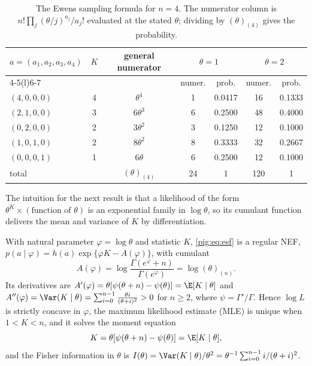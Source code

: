 \begin{table}[t]
\centering
\caption{The Ewens sampling formula for $n=4$. The numerator column is $n!\prod_j(\theta/j)^{a_j}/a_j!$ evaluated at the stated $\theta$; dividing by $(\theta)_{(4)}$ gives the probability.}
\label{pig:tab:n4}
\small
\begin{tabular}{@{}lcccccc@{}}
\toprule
$a=(a_1,a_2,a_3,a_4)$ & $K$ & general numerator & \multicolumn{2}{c}{$\theta=1$} & \multicolumn{2}{c}{$\theta=2$}\\
\cmidrule(lr){4-5}\cmidrule(l){6-7}
 & & & numer. & prob. & numer. & prob.\\
\midrule
$(4,0,0,0)$ & 4 & $\theta^4$ & 1 & 0.0417 & 16 & 0.1333\\
$(2,1,0,0)$ & 3 & $6\theta^3$ & 6 & 0.2500 & 48 & 0.4000\\
$(0,2,0,0)$ & 2 & $3\theta^2$ & 3 & 0.1250 & 12 & 0.1000\\
$(1,0,1,0)$ & 2 & $8\theta^2$ & 8 & 0.3333 & 32 & 0.2667\\
$(0,0,0,1)$ & 1 & $6\theta$ & 6 & 0.2500 & 12 & 0.1000\\
\midrule
total & & $(\theta)_{(4)}$ & 24 & 1 & 120 & 1\\
\bottomrule
\end{tabular}
\end{table}

The intuition for the next result is that a likelihood of the form $\theta^K\times(\text{function of }\theta)$ is an exponential family in $\log\theta$, so its cumulant function delivers the mean and variance of $K$ by differentiation.

\begin{proposition}\label{pig:prop:nef}
With natural parameter $\varphi=\log\theta$ and statistic $K$, \eqref{pig:eq:esf} is a regular NEF, $p(a\mid\varphi)=h(a)\exp\{\varphi K-A(\varphi)\}$, with cumulant
\[
A(\varphi)=\log\frac{\Gamma(e^{\varphi}+n)}{\Gamma(e^{\varphi})}=\log(\theta)_{(n)}.
\]
Its derivatives are $A'(\varphi)=\theta[\psi(\theta+n)-\psi(\theta)]=\E[K\mid\theta]$ and $A''(\varphi)=\Var(K\mid\theta)=\sum_{i=0}^{n-1}\frac{\theta i}{(\theta+i)^2}>0$ for $n\ge2$, where $\psi=\Gamma'/\Gamma$. Hence $\log L$ is strictly concave in $\varphi$, the maximum likelihood estimate (MLE) is unique when $1<K<n$, and it solves the moment equation
\begin{equation}\label{pig:eq:moment}
K=\theta[\psi(\theta+n)-\psi(\theta)]=\E[K\mid\theta],
\end{equation}
and the Fisher information in $\theta$ is $I(\theta)=\Var(K\mid\theta)/\theta^2=\theta^{-1}\sum_{i=0}^{n-1}i/(\theta+i)^2$.
\end{proposition}

